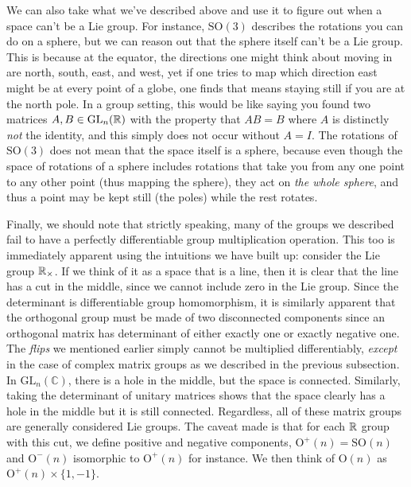 \documentclass[11pt]{article}
\begin{document}
We can also take what we've described above and use it to figure out when a space can't be a Lie group. For instance, $\mathrm{SO}(3)$ describes the rotations you can do on a sphere, but we can reason out that the sphere itself can't be a Lie group. This is because at the equator, the directions one might think about moving in are north, south, east, and west, yet if one tries to map which direction east might be at every point of a globe, one finds that  means staying still if you are at the north pole. In a group setting, this would be like saying you found two matrices $A,B \in \mathrm{GL}_n(\mathbb{R})$ with the property that $AB = B$ where $A$ is distinctly \emph{not} the identity, and this simply does not occur without $A = I$. The rotations of $\mathrm{SO}(3)$ does not mean that the space itself is a sphere, because even though the space of rotations of a sphere includes rotations that take you from any one point to any other point (thus mapping the sphere), they act on \emph{the whole sphere}, and thus a point may be kept still (the poles) while the rest rotates.

Finally, we should note that strictly speaking, many of the groups we described fail to have a perfectly differentiable group multiplication operation. This too is immediately apparent using the intuitions we have built up: consider the Lie group $\mathbb{R}_\times$. If we think of it as a space that is a line, then it is clear that the line has a cut in the middle, since we cannot include zero in the Lie group. Since the determinant is differentiable group homomorphism, it is similarly apparent that the orthogonal group must be made of two disconnected components since an orthogonal matrix has determinant of either exactly one or exactly negative one. The \emph{flips} we mentioned earlier simply cannot be multiplied differentiably, \emph{except} in the case of complex matrix groups as we described in the previous subsection. In $\mathrm{GL}_n(\mathbb{C})$, there is a hole in the middle, but the space is connected. Similarly, taking the determinant of unitary matrices shows that the space clearly has a hole in the middle but it is still connected. Regardless, all of these matrix groups are generally considered Lie groups. The caveat made is that for each $\mathbb{R}$ group with this cut, we define positive and negative components, $\mathrm{O}^+(n) = \mathrm{SO}(n)$ and $\mathrm{O}^-(n)$ isomorphic to $\mathrm{O}^+(n)$ for instance. We then think of $\mathrm{O}(n)$ as $\mathrm{O}^+(n) \times \{1,-1\}$.
\end{document}
